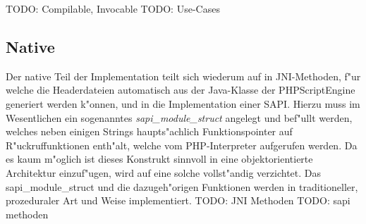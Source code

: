 TODO: Compilable, Invocable
TODO: Use-Cases

\subsection{Native}
\label{sec:chap1:design:native}

Der native Teil der Implementation teilt sich wiederum auf in JNI-Methoden, f"ur welche die Headerdateien automatisch aus
der Java-Klasse der PHPScriptEngine generiert werden k"onnen, und in die Implementation einer SAPI. Hierzu muss im
Wesentlichen ein sogenanntes \emph{sapi\_module\_struct} angelegt und bef"ullt werden, welches neben einigen Strings
haupts"achlich Funktionspointer auf R"uckruffunktionen enth"alt, welche vom PHP-Interpreter aufgerufen werden. Da es
kaum m"oglich ist dieses Konstrukt sinnvoll in eine objektorientierte Architektur einzuf"ugen, wird auf eine solche
vollst"andig verzichtet. Das sapi\_module\_struct und die dazugeh"origen Funktionen werden in traditioneller,
prozeduraler Art und Weise implementiert.
TODO: JNI Methoden
TODO: sapi methoden






